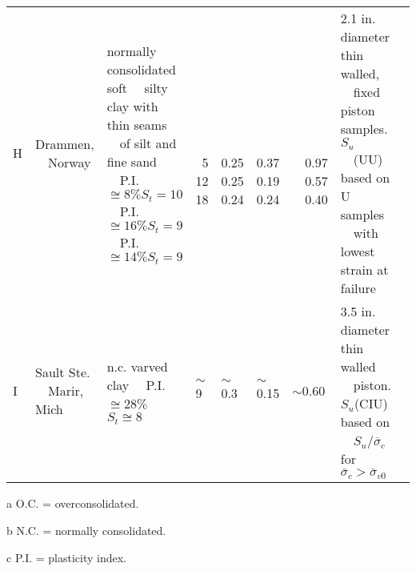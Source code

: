 \begin{table}[!htb]
\begin{threeparttable}[b]
{\begin{tabularx}{\textwidth}{lllllllll}
            H & \makecell[tl]{Drammen, \\~~Norway}                     & \makecell[tl]{normally consolidated soft \\~~silty clay with thin seams \\~~of silt and fine sand\\~~P.I.$\cong{}8\% S_t=10$\\~~P.I.$\cong{}16\% S_t=9$\\~~P.I.$\cong{}14\% S_t=9$} & \makecell[tl]{\\\\\\~5\\12\\18} & \makecell[tl]{\\\\\\0.25\\0.25\\0.24} & \makecell[tl]{\\\\\\0.37\\0.19\\0.24} & \makecell[tl]{\\\\\\~~0.97\\~~0.57\\~~0.40} & \makecell[tl]{2.1 in. diameter thin walled, \\~~fixed piston samples. $S_u$\\~~(UU) based on U samples \\~~with lowest strain at failure} & \citet{Simons1960727}\\
            I & \makecell[tl]{Sault Ste.\\~~Marir, Mich}               & \makecell[tl]{n.c. varved clay\\~~P.I.$\cong{}28\%$\\~~$S_t\cong{}8$} & $\sim$9 & $\sim$0.3 & $\sim$0.15 & $\sim$0.60 & \makecell[tl]{3.5 in. diameter thin walled \\~~piston. $S_u$(CIU) based on \\~~$S_u/\overline{\sigma}_c$ for $\overline{\sigma}_c>\overline{\sigma}_{v0}$} & \begin{minipage}[t]{1.4cm}\citet{Wu19581, Wu19621}\end{minipage}\\
            \bottomrule
        \end{tabularx}}%
        \begin{tablenotes}
            \item[a] O.C. = overconsolidated.
            \item[b] N.C. = normally consolidated.
            \item[c] P.I. = plasticity index.
        \end{tablenotes}
    \end{threeparttable}  
    \label{table:2}%
    \renewcommand{\arraystretch}{1.0}
\end{table}
